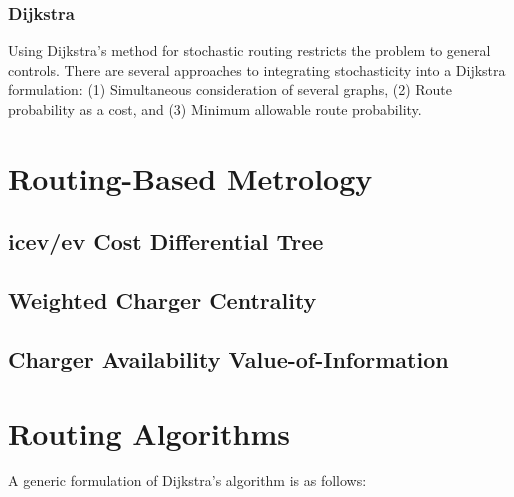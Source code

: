 \documentclass[12pt]{article}
\begin{document}
\subsubsection*{Dijkstra}

Using Dijkstra's method for stochastic routing restricts the problem to general controls. There are several approaches to integrating stochasticity into a Dijkstra formulation: (1) Simultaneous consideration of several graphs, (2) Route probability as a cost, and (3) Minimum allowable route probability.



\section*{Routing-Based Metrology}

\subsection*{\gls{icev}/\gls{ev} Cost Differential Tree}

\subsection*{Weighted Charger Centrality}

\subsection*{Charger Availability Value-of-Information}


\appendix
\section*{Routing Algorithms}

\noindent A generic formulation of Dijkstra's algorithm is as follows:
\end{document}

